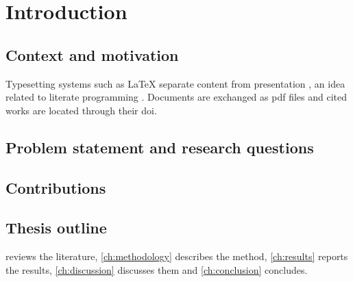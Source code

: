\chapter{Introduction}\label{ch:introduction}


\section{Context and motivation}\label{sec:context}

Typesetting systems such as \LaTeX{} separate content from presentation
\autocite{lamport1994latex}, an idea related to literate programming
\autocite{knuth1984literate}. Documents are exchanged as \gls{pdf} files and
cited works are located through their \gls{doi}.

\section{Problem statement and research questions}\label{sec:problem}

\section{Contributions}\label{sec:contributions}

\section{Thesis outline}\label{sec:outline}

 reviews the literature, \cref{ch:methodology} describes the
method, \cref{ch:results} reports the results, \cref{ch:discussion} discusses
them and \cref{ch:conclusion} concludes.
